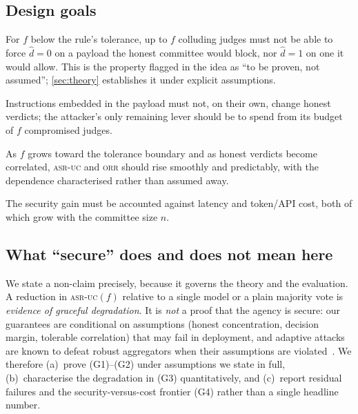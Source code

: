 \subsection{Design goals}
\begin{description}[leftmargin=0em,itemsep=2pt,topsep=2pt]
  \item[\textnormal{(G1) Decision integrity under a Byzantine minority.}] For $f$ below
        the rule's tolerance, up to $f$ colluding judges must not be able to force
        $\hat d=0$ on a payload the honest committee would block, nor $\hat d=1$ on one it
        would allow. This is the property flagged in the idea as ``to be proven, not
        assumed''; \cref{sec:theory} establishes it under explicit assumptions.
  \item[\textnormal{(G2) Second-order injection containment.}] Instructions embedded in
        the payload must not, on their own, change honest verdicts; the attacker's only
        remaining lever should be to spend from its budget of $f$ compromised judges.
  \item[\textnormal{(G3) Graceful degradation, not brittleness.}] As $f$ grows toward the
        tolerance boundary and as honest verdicts become correlated, \textsc{asr-uc} and
        \textsc{orr} should rise smoothly and predictably, with the dependence
        characterised rather than assumed away.
  \item[\textnormal{(G4) Bounded cost.}] The security gain must be accounted against
        latency and token/API cost, both of which grow with the committee size $n$.
\end{description}

\subsection{What ``secure'' does and does not mean here}
We state a non-claim precisely, because it governs the theory and the evaluation.
A reduction in \textsc{asr-uc}$(f)$ relative to a single model or a plain majority vote is
\emph{evidence of graceful degradation}. It is \emph{not} a proof that the agency is
secure: our guarantees are conditional on assumptions (honest concentration, decision
margin, tolerable correlation) that may fail in deployment, and adaptive attacks are known
to defeat robust aggregators when their assumptions are
violated~\cite{fang2020poisoning,baruch2019little}. We therefore (a)~prove (G1)--(G2)
under assumptions we state in full, (b)~characterise the degradation in (G3) quantitatively,
and (c)~report residual failures and the security-versus-cost frontier (G4) rather than a
single headline number.

